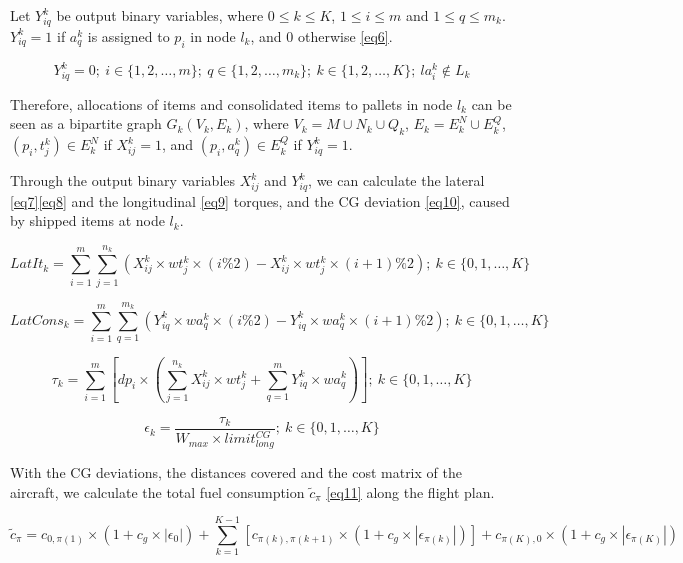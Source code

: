 \documentclass[preprint]{elsarticle}
\begin{document}
Let $Y_{iq}^k$\/ be output binary variables, where $0 \leq k \leq K$, $1 \leq i \leq m$\/ and $1 \leq q \leq m_k$. $Y_{iq}^k = 1$\/ if $a_q^k$\/ is assigned to $p_i$\/ in node $l_k$, and 0 otherwise \ref{eq6}.

\begin{equation} \label{eq6}
	Y_{iq}^k = 0; \ i \in \{1, 2, \ldots, m\}; \ q \in \{1, 2, \ldots, m_k\}; \ k \in \{ 1, 2, \ldots, K\}; \  la_i^k \notin L_k
\end{equation}

Therefore, allocations of items and consolidated items to pallets in node $l_k$ can be seen as a bipartite graph $G_k(V_k, E_k)$, where $V_k = M \cup N_k \cup Q_k$, $E_k = E^N_k \cup E^Q_k$, $(p_i, t_j^k) \in E^N_k$ if $X_{ij}^k = 1$, and $(p_i, a_q^k) \in E^Q_k$ if $Y_{iq}^k = 1$.

Through the output binary variables $X_{ij}^k$\/ and $Y_{iq}^k$, we can calculate the lateral \ref{eq7}\ref{eq8} and the longitudinal \ref{eq9} torques, and the CG deviation \ref{eq10}, caused by shipped items at node $l_k$.

\begin{equation} \label{eq7}
	LatIt_k = \sum_{i=1}^{m} \sum_{j=1}^{n_k} ( X_{ij}^k \times wt_j^k \times (i\%2) - X_{ij}^k \times wt_j^k \times (i+1)\%2 ); \ k \in \{0, 1, \ldots, K\}
\end{equation}

\begin{equation} \label{eq8}
	LatCons_k =  \sum_{i=1}^{m} \sum_{q=1}^{m_k}  ( Y_{iq}^k \times wa_q^k \times (i\%2) - Y_{iq}^k \times wa_q^k \times (i+1)\%2); \ k \in \{0, 1, \ldots, K\}
\end{equation}

\begin{equation} \label{eq9}
	\tau_k = \sum_{i=1}^{m}[ dp_i \times (\sum_{j=1}^{n_k} X_{ij}^k \times wt_j^k +  \sum_{q=1}^{m} Y_{iq}^k \times wa_q^k)];\ k \in \{0, 1, \ldots, K\}
\end{equation}

\begin{equation} \label{eq10}
	\epsilon_k = \frac{\tau_k}{W_{max} \times limit^{CG}_{long}};\ k \in \{0, 1, \ldots, K\}
\end{equation}

With the CG deviations, the distances covered and the cost matrix of the aircraft, we calculate the total fuel consumption $\tilde{c}_\pi$ \ref{eq11} along the flight plan.

\begin{equation} \label{eq11}
	\tilde{c}_\pi = c_{0,\pi(1)}\times(1+c_g\times|\epsilon_0|) + \sum_{k=1}^{K-1} [ c_{\pi(k), \pi(k+1)}\times(1+c_g\times|\epsilon_{\pi(k)}|) ] + c_{\pi(K),0}\times(1+c_g\times|\epsilon_{\pi(K)}|)
\end{equation}
\end{document}
